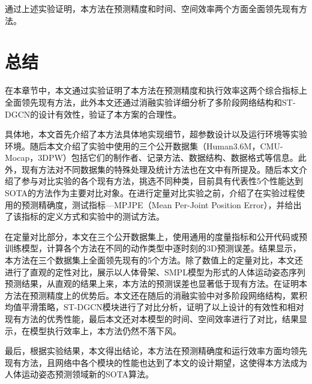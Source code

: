通过上述实验证明，本方法在预测精度和时间、空间效率两个方面全面领先现有方法。

\section{总结}
在本章节中，本文通过实验证明了本方法在预测精度和执行效率这两个综合指标上全面领先现有方法，此外本文还通过消融实验详细分析了多阶段网络结构和ST-DGCN的设计有效性，验证了本方案的合理性。

具体地，本文首先介绍了本方法具体地实现细节，超参数设计以及运行环境等实验环境。随后本文介绍了实验中使用的三个公开数据集（Human3.6M，CMU-Mocap，3DPW）包括它们的制作者、记录方法、数据结构、数据格式等信息。此外，现有方法对不同数据集的特殊处理及统计方法也在文中有所提及。随后本文介绍了参与对比实验的各个现有方法，挑选不同种类，目前具有代表性5个性能达到SOTA的方法作为主要对比对象。在进行定量对比实验之前，介绍了在实验过程使用的预测精确度，测试指标—MPJPE（Mean Per-Joint Position Error），并给出了该指标的定义方式和实验中的测试方法。

在定量对比部分，本文在三个公开数据集上，使用通用的度量指标和公开代码或预训练模型，计算各个方法在不同的动作类型中逐时刻的3D预测误差。结果显示，本方法在三个数据集上全面领先现有的5个方法。除了数值上的定量对比，本文还进行了直观的定性对比，展示以人体骨架、SMPL模型为形式的人体运动姿态序列预测结果，从直观的结果上来，本方法的预测误差也显著低于现有方法。在证明本方法在预测精度上的优势后。本文还在随后的消融实验中对多阶段网络结构，累积均值平滑策略，ST-DGCN模块进行了对比分析，证明了以上设计的有效性和相对现有方法的优秀性能，最后本文还对本模型的时间、空间效率进行了对比，结果显示，在模型执行效率上，本方法仍然不落下风。

最后，根据实验结果，本文得出结论，本方法在预测精确度和运行效率方面均领先现有方法，且网络中各个模块的性能也达到了本文的设计期望，这使得本方法成为人体运动姿态预测领域新的SOTA算法。

